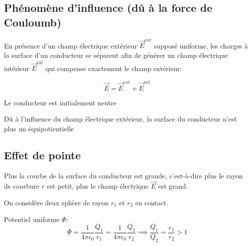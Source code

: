 \documentclass[
    11pt,
    a4paper,
    oneside,
    headinlcude, footinclude,
    twoside,
]{report}
\renewcommand{\vec}[1]{\overrightarrow{#1}}
\begin{document}
\subsection{Phénomène d'influence (d\^u à la force de Couloumb)}
\label{sub:phenomene_d_influence}

En présence d'un champ électrique extérieur $\vec E^{ext}$ supposé uniforme,
les charges à la surface d'un conducteur se séparent afin de générer un champ
électrique intérieur $\vec E^{int}$ qui compense exactement le champ extérieur:

\begin{equation}
    \label{eq:7.14}
    \vec E = \vec E^{ext} + \vec E^{int}
\end{equation}
\begin{center}
    \begin{minipage}{.5\linewidth}
    \end{minipage}
    \begin{minipage}{.49\linewidth}
        \setlength{\parskip}{.3em}
        Le conducteur est initialement neutre

        D\^u à l'influence du champ électrique extérieur, la surface du
        conducteur n'est plus un équipotientielle 
    \end{minipage}
\end{center}

\subsection{Effet de pointe}
\label{sub:effet_de_pointe}

Plus la courbe de la surface du conducteur est grande, c'est-à-dire plus le
rayon de courbure $r$ est petit, plus le champ électrique $\vec E$ est grand.

On considère deux sphère de rayon $r_1$ et $r_2$ en contact.

\begin{center}
    \begin{minipage}{.5\linewidth}
    \end{minipage}
    \begin{minipage}{.49\linewidth}
        \setlength{\parskip}{.3em}
        Potentiel uniforme $\Phi$:
        \begin{equation}
            \label{eq:7.15}
            \Phi = \frac{1}{4 \pi \epsilon_0} \frac{Q_1}{r_1} = \frac{1}{4 \pi \epsilon_0}
            \frac{Q_2}{r_2} \implies \frac{Q_1}{Q_2} = \frac{r_1}{r_2} > 1
        \end{equation}
    \end{minipage}
\end{center}
\end{document}
